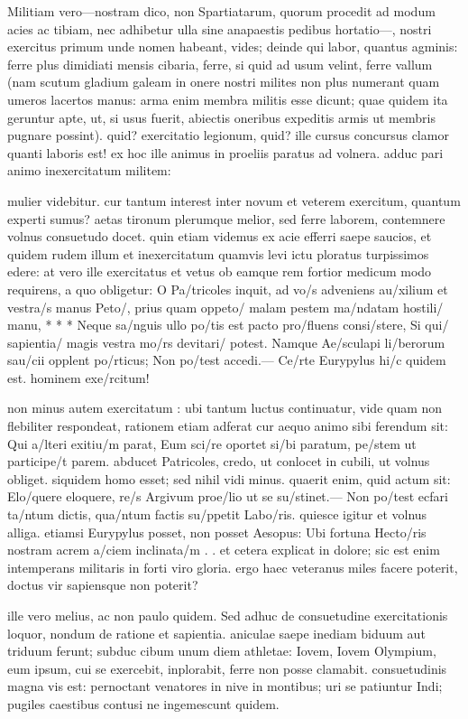  Militiam vero—nostram dico, non Spartiatarum, quorum procedit ad modum acies ac tibiam, nec adhibetur ulla sine anapaestis pedibus hortatio—, nostri exercitus primum unde nomen habeant, vides; deinde qui labor, quantus agminis: ferre plus dimidiati mensis cibaria, ferre, si quid ad usum velint, ferre vallum (nam scutum gladium galeam in onere nostri milites non plus numerant quam umeros lacertos manus: arma enim membra militis esse dicunt; quae quidem ita geruntur apte, ut, si usus fuerit, abiectis oneribus expeditis armis ut membris pugnare possint). quid? exercitatio legionum, quid? ille cursus concursus clamor quanti laboris est! ex hoc ille animus in proeliis paratus ad volnera. adduc pari animo inexercitatum militem:

 mulier videbitur. cur tantum interest inter novum et veterem exercitum, quantum experti sumus? aetas tironum plerumque melior, sed ferre laborem, contemnere volnus consuetudo docet. quin etiam videmus ex acie efferri saepe saucios, et quidem rudem illum et inexercitatum quamvis levi ictu ploratus turpissimos edere: at vero ille exercitatus et vetus ob eamque rem fortior medicum modo requirens, a quo obligetur: O Pa/tricoles inquit, ad vo/s adveniens au/xilium et vestra/s manus Peto/, prius quam oppeto/ malam pestem ma/ndatam hostili/ manu, * * * Neque sa/nguis ullo po/tis est pacto pro/fluens consi/stere, Si qui/ sapientia/ magis vestra mo/rs devitari/ potest. Namque Ae/sculapi li/berorum sau/cii opplent po/rticus; Non po/test accedi.— Ce/rte Eurypylus hi/c quidem est. hominem exe/rcitum!

 non minus autem exercitatum : ubi tantum luctus continuatur, vide quam non flebiliter respondeat, rationem etiam adferat cur aequo animo sibi ferendum sit: Qui a/lteri exitiu/m parat, Eum sci/re oportet si/bi paratum, pe/stem ut participe/t parem. abducet Patricoles, credo, ut conlocet in cubili, ut volnus obliget. siquidem homo esset; sed nihil vidi minus. quaerit enim, quid actum sit: Elo/quere eloquere, re/s Argivum proe/lio ut se su/stinet.— Non po/test ecfari ta/ntum dictis, qua/ntum factis su/ppetit Labo/ris. quiesce igitur et volnus alliga. etiamsi Eurypylus posset, non posset Aesopus: Ubi fortuna Hecto/ris nostram acrem a/ciem inclinata/m . . et cetera explicat in dolore; sic est enim intemperans militaris in forti viro gloria. ergo haec veteranus miles facere poterit, doctus vir sapiensque non poterit?

 ille vero melius, ac non paulo quidem. Sed adhuc de consuetudine exercitationis loquor, nondum de ratione et sapientia. aniculae saepe inediam biduum aut triduum ferunt; subduc cibum unum diem athletae: Iovem, Iovem Olympium, eum ipsum, cui se exercebit, inplorabit, ferre non posse clamabit. consuetudinis magna vis est: pernoctant venatores in nive in montibus; uri se patiuntur Indi; pugiles caestibus contusi ne ingemescunt quidem.

